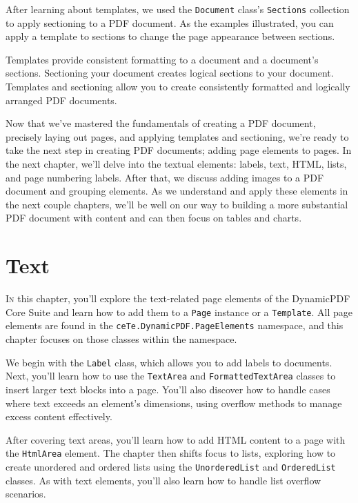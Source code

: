 \documentclass[american,letterpaper]{tufte-book}
\numberwithin{equation}{section}
\numberwithin{figure}{section}
\def\color#1{}%
\begin{document}
After learning about templates, we used the \texttt{Document} class's
\texttt{Sections} collection to apply sectioning to a PDF document.
As the examples illustrated, you can apply a template to sections
to change the page appearance between sections. 

Templates provide consistent formatting to a document and a document's
sections. Sectioning your document creates logical sections to your
document. Templates and sectioning allow you to create consistently
formatted and logically arranged PDF documents.

Now that we've mastered the fundamentals of creating a PDF document,
precisely laying out pages, and applying templates and sectioning,
we're ready to take the next step in creating PDF documents; adding
page elements to pages. In the next chapter, we'll delve into the
textual elements: labels, text, HTML, lists, and page numbering labels.
After that, we discuss adding images to a PDF document and grouping
elements. As we understand and apply these elements in the next couple
chapters, we'll be well on our way to building a more substantial
PDF document with content and can then focus on tables and charts.

\color{white}
\chapter{Text}\label{chap:Page-Elements--text}
\color{black}
\BgThispage
\vspace{8.00em}
\lettrine[lines=2,lhang=0.1]{I}{n} this chapter, you'll explore the text-related page elements of the DynamicPDF Core Suite and learn how to add them to a \texttt{Page} instance or a \texttt{Template}. All page elements are found in the \texttt{ceTe.DynamicPDF.PageElements} namespace, and this chapter focuses on those classes within the namespace.

We begin with the \texttt{Label} class, which allows you to add labels to documents. Next, you'll learn how to use the \texttt{TextArea} and \texttt{FormattedTextArea} classes to insert larger text blocks into a page. You'll also discover how to handle cases where text exceeds an element's dimensions, using overflow methods to manage excess content effectively.

After covering text areas, you'll learn how to add HTML content to a page with the \texttt{HtmlArea} element. The chapter then shifts focus to lists, exploring how to create unordered and ordered lists using the \texttt{UnorderedList} and \texttt{OrderedList} classes. As with text elements, you'll also learn how to handle list overflow scenarios.
\end{document}
